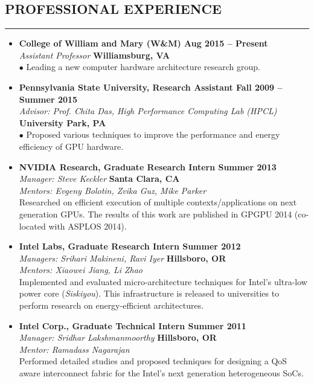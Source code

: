 \documentclass[10pt,a4]{article}
\begin{document}
\subsection*{PROFESSIONAL EXPERIENCE}
\hrule
\vspace{0.2cm}
\begin{itemize}

\item{\bf College of William and Mary (W\&M) \hfill {\bf Aug 2015 -- Present}} \\
{\it Assistant Professor} \hfill {\bf Williamsburg, VA}\\
$\bullet$ Leading a new computer hardware architecture research group. 

\item{\bf Pennsylvania State University, Research Assistant \hfill {\bf Fall 2009 -- Summer 2015}}\\
{\it Advisor: Prof. Chita Das, High Performance Computing Lab (HPCL)} \hfill {\bf University Park, PA} \\
$\bullet$ Proposed various techniques to improve the performance and energy efficiency of GPU hardware.

\item{\bf NVIDIA Research, Graduate Research Intern \hfill {\bf Summer 2013}} \\
{\it Manager: Steve Keckler}  \hfill {\bf Santa Clara, CA} \\ 
{\it Mentors: Evgeny Bolotin, Zvika Guz, Mike Parker}  \\
Researched on efficient execution of multiple contexts/applications on next generation GPUs.
The results of this work are published in GPGPU 2014 (co-located with ASPLOS 2014).

\item{\bf Intel Labs, Graduate Research Intern \hfill {\bf Summer 2012}} \\
{\it Managers: Srihari Makineni, Ravi Iyer}  \hfill {\bf Hillsboro, OR} \\ 
{\it Mentors: Xiaowei Jiang, Li Zhao}    \\
Implemented and evaluated micro-architecture techniques for Intel's ultra-low power core ({\it Siskiyou}).
This infrastructure is released to universities to perform research on energy-efficient architectures.

\item{\bf Intel Corp., Graduate Technical Intern \hfill {\bf Summer 2011}} \\
{\it Manager: Sridhar Lakshmanmoorthy}  \hfill {\bf Hillsboro, OR} \\ 
{\it Mentor: Ramadass Nagarajan}   \\
Performed detailed studies and proposed techniques for designing a QoS aware 
interconnect fabric for the Intel's next generation heterogeneous SoCs. 

\end{itemize}
\end{document}
